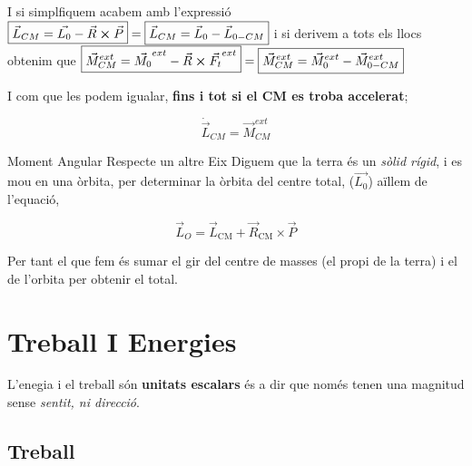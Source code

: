 \documentclass[12pt]{article}
\begin{document}
I si simplfiquem acabem amb l'expressió $\boxed{\vec{L}_{CM} = \vec{L_0} - \vec{R} \cross \vec{P}} = \boxed{\vec{L}_{CM} = \vec{L}_0 - \vec{L}_{0-CM}}$ i si derivem a tots els llocs obtenim que $\boxed{\vec{M}_{CM}^{ext} = \vec{M_0}^{ext} - \vec{R}\cross\vec{F_t}^{ext}} = \boxed{\vec{M}^{ext}_{CM} = \vec{M}^{ext}_0 - \vec{M}^{ext}_{0-CM}}$

I com que les podem igualar, \textbf{fins i tot si el CM es troba accelerat};

\[\dot{\vec{L}}_{CM} = \vec{M}_{CM}^{ext}\]

\begin{examplebox}{Moment Angular Respecte un altre Eix}
    Diguem que la terra és un \textit{sòlid rígid}, i es mou en una òrbita, per determinar la òrbita del centre total, ($\vec{L_0}$) aïllem de l'equació,

    \[\vec L_O=\vec L_{\mathrm{CM}} + \vec R_{\mathrm{CM}}\times\vec{P}\]

    Per tant el que fem és sumar el gir del centre de masses (el propi de la terra) i el de l'orbita per obtenir el total.

\begin{center}
\end{center}

\end{examplebox}

\section{Treball I Energies}

L'enegia i el treball són \textbf{unitats escalars} és a dir que només tenen una magnitud sense \textit{sentit, ni direcció}.

\subsection{Treball}
\end{document}
